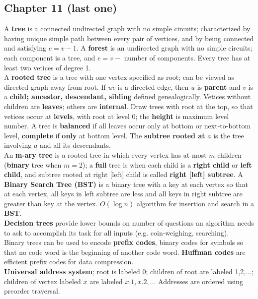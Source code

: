 \documentclass[12pt]{article}
\begin{document}
\subsection{Chapter 11 (last one)}
A \textbf{tree} is a connected undirected graph with no simple circuits; characterized by having unique simple path between every pair of vertices, and by being connected and satisfying $e = v -1$. A \textbf{forest} is an undirected graph with no simple circuits; each component is a tree, and $ e = v -$ number of components. Every tree has at least two vetices of degree 1. \\
A \textbf{rooted tree} is a tree with one vertex specified as root; can be viewed as directed graph away from root. If $uv$ is a directed edge, then $u$ is \textbf{parent} and $v$ is a \textbf{child; ancestor, descendant, sibling} defined genealogically. Vetices without children are \textbf{leaves}; others are \textbf{internal}. Draw trees with root at the top, so that vetices occur at \textbf{levels}, with root at level 0; the \textbf{height} is maximum level number. A tree is \textbf{balanced} if all leaves occur only at bottom or next-to-bottom level, \textbf{complete} if \textbf{only} at bottom level. The \textbf{subtree rooted at} $a$ is the tree involving $a$ and all its descendants. \\
An \textbf{m-ary tree} is a rooted tree in which every vertex has at most $m$ children (\textbf{binary} tree when $m = 2$); a \textbf{full} tree is when each child is a \textbf{right child} or \textbf{left child}, and subtree rooted at right [left] child is called \textbf{right [left] subtree}. A \textbf{Binary Search Tree (BST)} is a binary tree with a key at each vertex so that at each vertex, all keys in left subtree are less and all keys in right subtree are greater than key at the vertex. $O(\log n)$ algorithm for insertion and search in a \textbf{BST}. \\
\textbf{Decision trees} provide lower bounds on number of questions an algorithm needs to ask to accomplish its task for all inputs (e.g. coin-weighing, searching). \\
Binary trees can be used to encode \textbf{prefix codes}, binary codes for symbols so that no code word is the beginning of another code word. \textbf{Huffman codes} are efficient prefix codes for data compression. \\
\textbf{Universal address system}; root is labeled 0; children of root are labeled 1,2,...; children of vertex labeled $x$ are labeled $x.1,x.2,...$ Addresses are ordered using preorder traversal. \\
\end{document}
